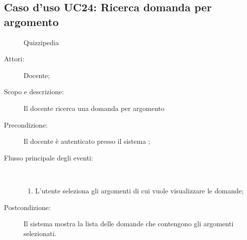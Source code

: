 \subsection{Caso d'uso UC24: Ricerca domanda per argomento}
	\begin{figure}[H]
		\centering
		\begin{resizedtikzpicture}{\textwidth}
		\begin{umlsystem}[x=0, fill=lightgray!20]{Quizzipedia}
		\end{umlsystem}
		\end{resizedtikzpicture}
		\caption{}
	\end{figure}
\begin{description}
\item[Attori:] Docente;
\item[Scopo e descrizione:] Il docente ricerca una domanda per argomento
      \item[Precondizione:] Il docente è autenticato presso il sistema
;

        \item[Flusso principale degli eventi:] \ 
 \begin{enumerate}
          \item L'utente seleziona gli argomenti di cui vuole visualizzare le domande;

      \end{enumerate}
    \item[Postcondizione:] Il sistema mostra la lista delle domande che contengono gli argomenti selezionati.
  \end{description}
\hypertarget{UC25}{}
